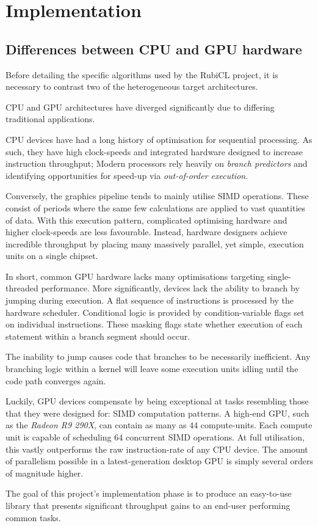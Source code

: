 \chapter{Implementation}
\section{Differences between CPU and GPU hardware}
Before detailing the specific algorithms  used by the RubiCL project, it is necessary to contrast two of the heterogeneous target architectures.

\ac{CPU} and \ac{GPU} architectures have diverged significantly due to differing traditional applications.

\ac{CPU} devices have had a long history of optimisation for sequential processing. As such, they have high clock-speeds and integrated hardware designed to increase instruction throughput; Modern processors rely heavily on \emph{branch predictors} and identifying opportunities for speed-up via \emph{out-of-order execution}.

Conversely, the graphics pipeline tends to mainly utilise \ac{SIMD} operations. These consist of periods where the same few calculations are applied to vast quantities of data. With this execution pattern, complicated optimising hardware and higher clock-speeds are less favourable. Instead, hardware designers achieve incredible throughput by placing many massively parallel, yet simple, execution units on a single chipset.

In short, common \ac{GPU} hardware lacks many optimisations targeting single-threaded performance. More significantly, devices lack the ability to branch by jumping during execution. A flat sequence of instructions is processed by the hardware scheduler. Conditional logic is provided by condition-variable flags set on individual instructions. These masking flags state whether execution of each statement within a branch segment should occur.

The inability to jump causes code that branches to be necessarily inefficient. Any branching logic within a kernel will leave some execution units idling until the code path converges again.

Luckily, \ac{GPU} devices compensate by being exceptional at tasks resembling those that they were designed for: \ac{SIMD} computation patterns. A high-end \ac{GPU}, such as the \emph{Radeon R9 290X}, can contain as many as $44$ compute-units. Each compute unit is capable of scheduling $64$ concurrent \ac{SIMD} operations. At full utilisation, this vastly outperforms the raw instruction-rate of any \ac{CPU} device. The amount of parallelism possible in a latest-generation desktop \ac{GPU} is simply several orders of magnitude higher.

The goal of this project's implementation phase is to produce an easy-to-use library that presents significant throughput gains to an end-user performing common tasks.








